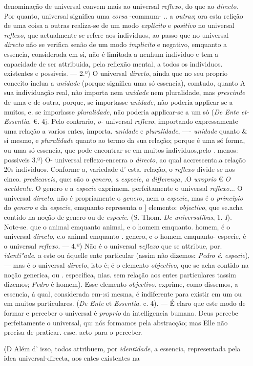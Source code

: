 denominação de universal convem mais ao universal \emph{reflexo}, do que ao \emph{directo}. Por quanto, universal significa uma \emph{corsa} -commum- .. a \emph{outras}; ora esta relição de uma coisa a outras realiza-se de um modo \emph{explicito} e \emph{positivo} no universal \emph{reflexo}, que actualmente se refere aos individuos, ao passo que no universal \emph{directo} não se verifica senão de um modo \emph{implicito} e negativo, emquanto a essencia, considerada em si, não é limitada a nenhum individuo e tem a capacidade de ser attribuida, pela reflexão mental, a todos os individuos. existentes e possiveis. --- 2.º) O universal \emph{directo}, ainda que no seu proprio conceito inclua a \emph{unidade} (porque significa uma só essencia), comtudo, quanto A sua individuação real, não importa nem \emph{unidade} nem pluralidade, mas \emph{prescinde} de uma e de outra, porque, se importasse \emph{unidade}, não poderia applicar-se a muitos, e. se imporlasse \emph{pluralidade}, não poderia applicar-se a um só (\emph{De Ente et-Essentia}. €. 4j. Pelo contrario, \emph{o}- universal \emph{reflexo}, importando expressamente uma relação a varios entes, importa. \emph{unidade} e \emph{pluralidade}, ---- \emph{unidade} quanto \& si mesmo, e \emph{pluralidade} quanto ao termo da sua relação; porque é uma só forma, ou uma só essencia, que pode encontrar-se em muitos individuos,pelo . menos: possiveis 3.º) O- universal reflexo-encerra o \emph{directo}, ao qual accrescenta.a relação 20s individuos. Conforme a, variedade d' esta. relação, o \emph{reflexo} divide-se nos cinco. \emph{predicaveis}, que: são o \emph{genero}, \emph{a especie}, \emph{a differença}, .O \emph{wroprio} € \emph{O accidente}. O genero e a \emph{especie} exprimem. perfeitamente o universal \emph{reflexo}... O universal \emph{directo}. não é propriamente o \emph{genero}, nem a \emph{especie}, mas é o \emph{principio} do \emph{genero} e da \emph{especie}, emquanto representa o ] elemento: \emph{objectivo}, que se.acha contido na noção de genero ou de \emph{especie}. (S. Thom. \emph{De universalibus}, 1. \emph{I}). Note-se. que o animal emquanto animal, e o homem emquanto. homem, é o universal \emph{directo}, e.o animal emquanto . genero, e o homem emquanto- especie, é o universal \emph{reflexo}. --- 4.º) Não é o universal \emph{veflexo} que se attribue, por. \emph{identi"ade}. a este ou áquelle ente particular (assim não dizemos: \emph{Pedro é}. \emph{especie}), --- mas é o universal \emph{directo}, isto é; é o elemento \emph{objectivo}, que se acha contido na noção generica, ou . especifica, nias. sem relação aos entes particulares tassim dizemos; \emph{Pedro} é homem). Esse elemento \emph{objectivo}. exprime, como dissemos, a essencia, á qual, considerada em-:si mesma, é indiferente para existir em um ou em muitos particulares. (\emph{De Ente} et \emph{Essentia}. c. 4). --- É claro que este modo de formar e perceber o universal é \emph{proprio} da intelligencia bumana. Deus percebe perfeitamente o universal, qu: nós formamos pela abstracção; mas Elle não precisa de praticar. esse. acto para o perceber.\par (D Além d' isso, todos attribuem, por \emph{identidade}, a essencia, representada pela idea universal-directa, aos entes existentes na 